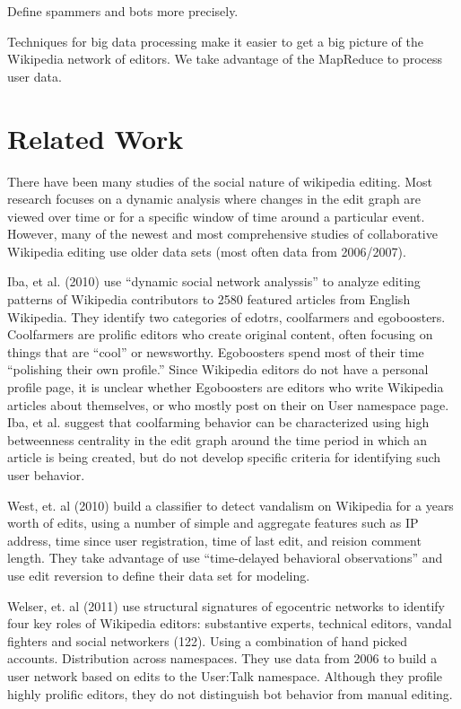 \documentclass{article}
\begin{document}
Define spammers and bots more precisely.

Techniques for big data processing make it easier to get a big picture of the Wikipedia network of editors. We take advantage of the MapReduce to process user data.

\section{Related Work}

There have been many studies of the social nature of wikipedia editing. Most research focuses on a dynamic analysis where changes in the edit graph are viewed over time or for a specific window of time around a particular event. However, many of the newest and most comprehensive studies of collaborative Wikipedia editing use older data sets (most often data from 2006/2007).

Iba, et al. (2010) use ``dynamic social network analyssis'' to analyze editing patterns of Wikipedia contributors to 2580 featured articles from English Wikipedia. They identify two categories of edotrs, coolfarmers and egoboosters. Coolfarmers are prolific editors who create original content, often focusing on things that are ``cool'' or newsworthy. Egoboosters spend most of their time ``polishing their own profile.'' Since Wikipedia editors do not have a personal profile page, it is unclear whether Egoboosters are editors who write Wikipedia articles about themselves, or who mostly post on their on User namespace page. Iba, et al. suggest that coolfarming behavior can be characterized using high betweenness centrality in the edit graph around the time period in which an article is being created, but do not develop specific criteria for identifying such user behavior.

West, et. al (2010) build a classifier to detect vandalism on Wikipedia for a years worth of edits, using a number of simple and aggregate features such as IP address, time since user registration, time of last edit, and reision comment length. They take advantage of use ``time-delayed behavioral observations'' and use edit reversion to define their data set for modeling.

Welser, et. al (2011) use structural signatures of egocentric networks to identify four key roles of Wikipedia editors: substantive experts, technical editors, vandal fighters and social networkers (122). Using a combination of hand picked accounts. Distribution across namespaces. They use data from 2006 to build a user network based on edits to the User:Talk namespace. Although they profile highly prolific editors, they do not distinguish bot behavior from manual editing.
\end{document}
